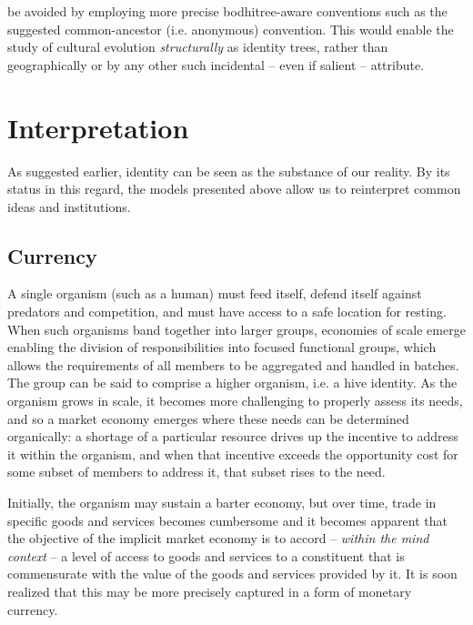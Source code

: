 \documentclass[pra,twocolumn,groupedaddress,10pt]{revtex4}
\theoremstyle{definition}
\begin{document}
be avoided by employing more precise bodhitree-aware conventions such as the suggested common-ancestor (i.e. anonymous) convention. This would enable the study of cultural evolution \emph{structurally} as identity trees, rather than geographically or by any other such incidental -- even if salient -- attribute.

\section{Interpretation} \label{sec:interpretation}

As suggested earlier, identity can be seen as the substance of our reality. By its status in this regard, the models presented above allow us to reinterpret common ideas and institutions.

\subsection{Currency} \label{sec:currency}

A single organism (such as a human) must feed itself, defend itself against predators and competition, and must have access to a safe location for resting. When such organisms band together into larger groups, economies of scale emerge enabling the division of responsibilities into focused functional groups, which allows the requirements of all members to be aggregated and handled in batches. The group can be said to comprise a higher organism, i.e. a hive identity. As the organism grows in scale, it becomes more challenging to properly assess its needs, and so a market economy emerges where these needs can be determined organically: a shortage of a particular resource drives up the incentive to address it within the organism, and when that incentive exceeds the opportunity cost for some subset of members to address it, that subset rises to the need.

Initially, the organism may sustain a barter economy, but over time, trade in specific goods and services becomes cumbersome and it becomes apparent that the objective of the implicit market economy is to accord -- \textit{within the mind context} -- a level of access to goods and services to a constituent that is commensurate with the value of the goods and services provided by it. It is soon realized that this may be more precisely captured in a form of monetary currency.
\end{document}
